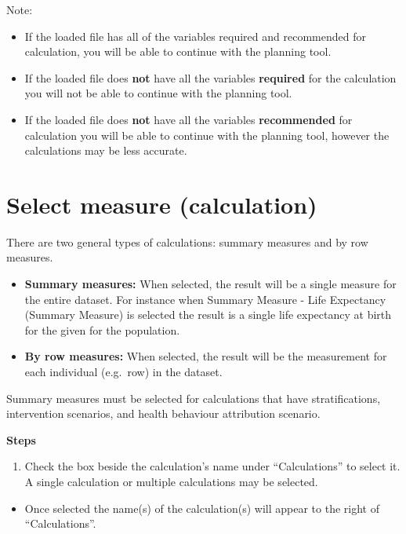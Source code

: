 \documentclass[]{book}
\providecommand{\tightlist}{%
  \setlength{\itemsep}{0pt}\setlength{\parskip}{0pt}}
\begin{document}
Note:

\begin{itemize}
\item
  If the loaded file has all of the variables required and recommended for calculation, you will be able to continue with the planning tool.
\item
  If the loaded file does \textbf{not} have all the variables \textbf{required} for the calculation you will not be able to continue with the planning tool.
\item
  If the loaded file does \textbf{not} have all the variables \textbf{recommended} for calculation you will be able to continue with the planning tool, however the calculations may be less accurate.
\end{itemize}

\hypertarget{select-measure-calculation}{%
\section{Select measure (calculation)}\label{select-measure-calculation}}

There are two general types of calculations: summary measures and by row measures.

\begin{itemize}
\item
  \textbf{Summary measures:} When selected, the result will be a single measure for the entire dataset. For instance when Summary Measure - Life Expectancy (Summary Measure) is selected the result is a single life expectancy at birth for the given for the population.
\item
  \textbf{By row measures:} When selected, the result will be the measurement for each individual (e.g.~row) in the dataset.
\end{itemize}

Summary measures must be selected for calculations that have stratifications, intervention scenarios, and health behaviour attribution scenario.

\textbf{Steps}

\begin{enumerate}
\def\labelenumi{\arabic{enumi}.}
\tightlist
\item
  Check the box beside the calculation's name under ``Calculations'' to select it. A single calculation or multiple calculations may be selected.
\end{enumerate}

\begin{itemize}
\tightlist
\item
  Once selected the name(s) of the calculation(s) will appear to the right of ``Calculations''.
\end{itemize}
\end{document}
